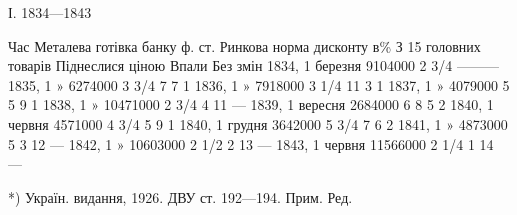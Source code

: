 І. 1834—1843

Час        Металева готівка банку ф. ст. Ринкова  норма  дисконту  в\%     З 15 головних товарів
Піднеслися ціною      Впали     Без змін
1834, 1    березня   9104000    2 3/4 ———
1835, 1    »    6274000    3 3/4    7    7    1
1836, 1    »    7918000    3 1/4    11    3    1
1837, 1    »  4079000    5    5    9    1
1838, 1    »   10471000    2 3/4    4    11 —
1839, 1    вересня   2684000    6    8    5    2
1840, 1    червня  4571000    4 3/4    5    9    1
1840, 1    грудня 3642000    5 3/4    7    6    2
1841, 1    »    4873000    5    3    12 —
1842, 1    »    10603000    2 1/2    2    13 —
1843, 1    червня  11566000    2 1/4    1    14 —

*) Україн. видання, 1926. ДВУ ст. 192—194. Прим. Ред.
